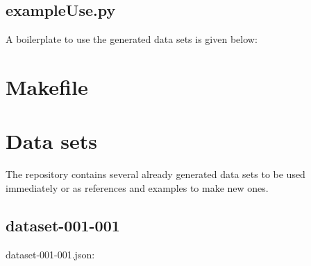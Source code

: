 \begin{scriptsize}
\begin{ttfamily}

\end{ttfamily}
\end{scriptsize}

\subsection{exampleUse.py}

A boilerplate to use the generated data sets is given below:
 
\begin{scriptsize}
\begin{ttfamily}

\end{ttfamily}
\end{scriptsize}

\section{Makefile}

\begin{scriptsize}
\begin{ttfamily}

\end{ttfamily}
\end{scriptsize}

\section{Data sets}

The repository contains several already generated data sets to be used immediately or as references and examples to make new ones.

\subsection{dataset-001-001}

dataset-001-001.json:
\begin{scriptsize}
\begin{ttfamily}

\end{ttfamily}
\end{scriptsize}

